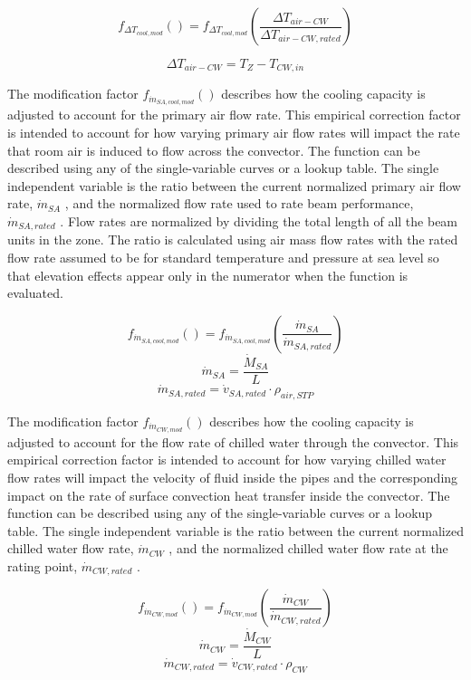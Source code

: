 \begin{equation}
{f_{ \Delta T_{cool,mod} }() } = f_{ \Delta T_{cool,mod} }\left(\frac{\Delta T_{air-CW}}{\Delta T_{air-CW,rated}}\right)
\end{equation}

\begin{equation}
{\Delta T_{air-CW}} = {T_{Z}}-{T_{CW,in}}
\end{equation}

The modification factor \({f_{\dot m_{SA,cool,mod}}()}\) describes how the cooling capacity is adjusted to account for the primary air flow rate. This empirical correction factor is intended to account for how varying primary air flow rates will impact the rate that room air is induced to flow across the convector. The function can be described using any of the single-variable curves or a lookup table. The single independent variable is the ratio between the current normalized primary air flow rate, \({\dot m_{SA}}\) , and the normalized flow rate used to rate beam performance, \({\dot m_{SA,rated}}\) . Flow rates are normalized by dividing the total length of all the beam units in the zone. The ratio is calculated using air mass flow rates with the rated flow rate assumed to be for standard temperature and pressure at sea level so that elevation effects appear only in the numerator when the function is evaluated.

\[{f_{\dot m_{SA,cool,mod}}()} = f_{\dot m_{SA,cool,mod}}\left(\frac{{\dot m_{SA}}}{{\dot m_{SA,rated}} }\right)\] \[{\dot m_{SA}} = \frac{\dot M_{SA}}{L}\] \[{\dot m_{SA,rated}} = {\dot v_{SA,rated}} \cdot {\rho_{air,STP}}\]

The modification factor \(f_{\dot m_{CW,mod}}()\) describes how the cooling capacity is adjusted to account for the flow rate of chilled water through the convector. This empirical correction factor is intended to account for how varying chilled water flow rates will impact the velocity of fluid inside the pipes and the corresponding impact on the rate of surface convection heat transfer inside the convector. The function can be described using any of the single-variable curves or a lookup table. The single independent variable is the ratio between the current normalized chilled water flow rate, \({\dot m_{CW}}\) , and the normalized chilled water flow rate at the rating point, \({\dot m_{CW,rated}}\) .

\[{f_{\dot m_{CW,mod}}()} = f_{\dot m_{CW,mod}}\left(\frac{{\dot m_{CW}}}{{\dot m_{CW,rated}}}\right)\] \[{\dot m_{CW}} = \frac{\dot M_{CW}}{L}\] \[{\dot m_{CW,rated}} = {\dot v_{CW,rated}} \cdot {\rho_{CW}}\]

